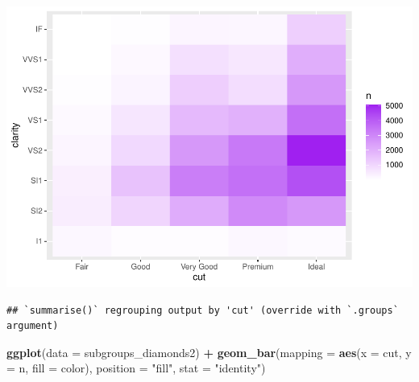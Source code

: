 \documentclass[
]{book}
\newenvironment{Shaded}{\begin{snugshade}}{\end{snugshade}}
\newcommand{\CommentTok}[1]{\textcolor[rgb]{0.56,0.35,0.01}{\textit{#1}}}
\newcommand{\DataTypeTok}[1]{\textcolor[rgb]{0.13,0.29,0.53}{#1}}
\newcommand{\KeywordTok}[1]{\textcolor[rgb]{0.13,0.29,0.53}{\textbf{#1}}}
\newcommand{\NormalTok}[1]{#1}
\newcommand{\OperatorTok}[1]{\textcolor[rgb]{0.81,0.36,0.00}{\textbf{#1}}}
\newcommand{\StringTok}[1]{\textcolor[rgb]{0.31,0.60,0.02}{#1}}
\begin{document}
\includegraphics{_main_files/figure-latex/unnamed-chunk-319-3.pdf}

\begin{Shaded}
\end{Shaded}

\begin{verbatim}
## `summarise()` regrouping output by 'cut' (override with `.groups` argument)
\end{verbatim}

\begin{Shaded}
\begin{Highlighting}[]
\KeywordTok{ggplot}\NormalTok{(}\DataTypeTok{data =}\NormalTok{ subgroups_diamonds2) }\OperatorTok{+}\StringTok{ }\KeywordTok{geom_bar}\NormalTok{(}\DataTypeTok{mapping =} \KeywordTok{aes}\NormalTok{(}\DataTypeTok{x =}\NormalTok{ cut,}
    \DataTypeTok{y =}\NormalTok{ n, }\DataTypeTok{fill =}\NormalTok{ color), }\DataTypeTok{position =} \StringTok{"fill"}\NormalTok{, }\DataTypeTok{stat =} \StringTok{"identity"}\NormalTok{)}
\end{Highlighting}
\end{Shaded}
\end{document}
